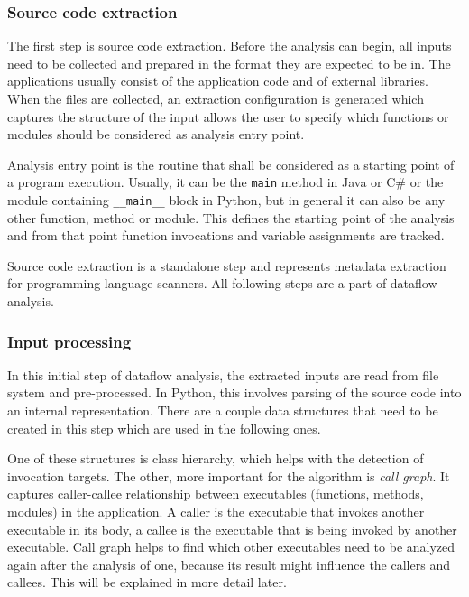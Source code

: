 \subsubsection{Source code extraction}

The first step is source code extraction. Before the analysis can begin, all inputs need to be collected and prepared in the format they are expected to be in. The applications usually consist of the application code and of external libraries. When the files are collected, an extraction configuration is generated which captures the structure of the input allows the user to specify which functions or modules should be considered as analysis entry point.
\par
Analysis entry point is the routine that shall be considered as a starting point of a program execution. Usually, it can be the \texttt{main} method in Java or C\# or the module containing \texttt{\_\_main\_\_} block in Python, but in general it can also be any other function, method or module. This defines the starting point of the analysis and from that point function invocations and variable assignments are tracked.
\par
Source code extraction is a standalone step and represents metadata extraction for programming language scanners. All following steps are a part of dataflow analysis.

\subsubsection{Input processing}

In this initial step of dataflow analysis, the extracted inputs are read from file system and pre-processed. In Python, this involves parsing of the source code into an internal representation. There are a couple data structures that need to be created in this step which are used in the following ones.
\par
One of these structures is class hierarchy, which helps with the detection of invocation targets. The other, more important for the algorithm is \textit{call graph}. It captures caller-callee relationship between executables (functions, methods, modules) in the application. A caller is the executable that invokes another executable in its body, a callee is the executable that is being invoked by another executable. Call graph helps to find which other executables need to be analyzed again after the analysis of one, because its result might influence the callers and callees. This will be explained in more detail later.

